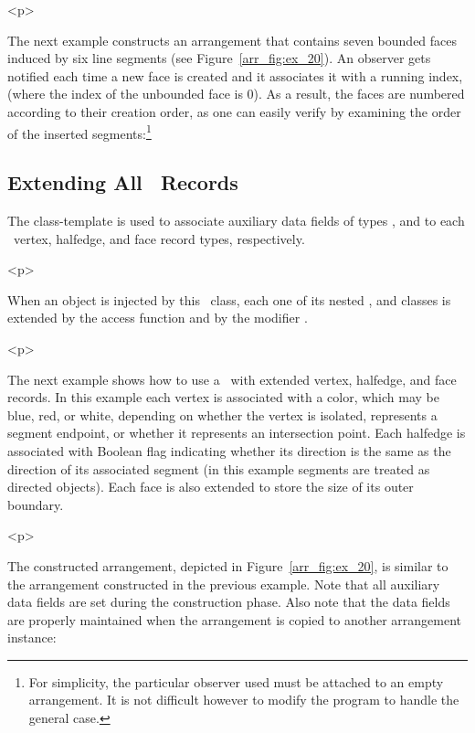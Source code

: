 \begin{ccHtmlOnly}<p>\end{ccHtmlOnly}
The next example constructs an arrangement that contains seven bounded 
faces induced by six line segments (see Figure~\ref{arr_fig:ex_20}). An 
observer gets notified each time a new face is created and it associates 
it with a running index, (where the index of the unbounded face
is 0). As a result, the faces are numbered according to their creation
order, as one can easily verify by examining the order of the inserted
segments:\footnote{For simplicity, the particular observer used must be
attached to an empty arrangement. It is not difficult however to modify 
the program to handle the general case.}


\subsection{Extending All \dcel\ Records}
\label{arr_ssec:ex_dcel_all}
%
The 
class-template is used to associate auxiliary data fields of
types  , and  to
each \dcel\ vertex, halfedge, and face record types, respectively.

\begin{ccHtmlOnly}<p>\end{ccHtmlOnly}
When an  object is injected by this
\dcel\ class, each one of its nested ,  and
 classes is extended by the access function 
and by the modifier .

\begin{ccHtmlOnly}<p>\end{ccHtmlOnly}
The next example shows how to use a \dcel\ with extended vertex,
halfedge, and face records. In this example each vertex is associated 
with a color, which may be blue, red, or white, depending on whether the
vertex is isolated, represents a segment endpoint, or whether it
represents an intersection point. Each halfedge is associated with
Boolean flag indicating whether its direction is the same as the
direction of its associated segment (in this example segments are
treated as directed objects). Each face is also extended to store the
size of its outer boundary.

\begin{ccHtmlOnly}<p>\end{ccHtmlOnly}
The constructed arrangement, depicted in Figure~\ref{arr_fig:ex_20}, is 
similar to the arrangement constructed in the previous example. 
Note that all auxiliary data fields are set during the construction phase.
Also note that the data fields are properly maintained when the arrangement
is copied to another arrangement instance:
 
